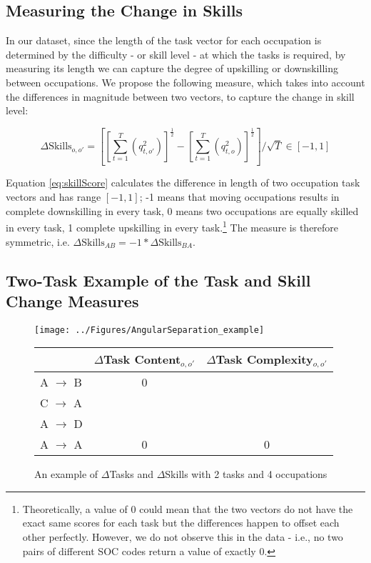 \documentclass[12pt,authoryear]{elsarticle}
\begin{document}
	
	
	
	\subsection{Measuring the Change in Skills}
	\label{sec:changeSkillLevel}
	In our dataset, since the length of the task vector for each occupation is determined by the difficulty - or skill level - at which the tasks is required, by measuring its length we can capture the degree of upskilling or downskilling between occupations. We propose the following measure, which takes into account the differences in magnitude between two vectors, to capture the change in skill level: 
	
	\begin{equation}
	\label{eq:skillScore}
	\Delta\text{Skills}_{o,o'} = \left[\left[\sum_{t=1}^{T}(q_{t,o'}^{2})\right]^{\frac{1}{2}} - \left[\sum_{t=1}^{T}(q_{t,o}^{2})\right]^{\frac{1}{2}} \right]/\sqrt{T} \in[-1,1]
	\end{equation}
	
	
	\noindent Equation \ref{eq:skillScore} calculates the difference in length of two occupation task vectors and has range $[-1,1]$; -1 means that moving occupations results in complete downskilling in every task, 0 means two occupations are equally skilled in every task, 1 complete upskilling in every task.\footnote{Theoretically, a value of 0 could mean that the two vectors do not have the exact same scores for each task but the differences happen to offset each other perfectly. However, we do not observe this in the data - i.e., no two pairs of different SOC codes return a value of exactly 0. } The measure is therefore symmetric, i.e. $\Delta\text{Skills}_{{A}{B}}  = -1* \Delta\text{Skills}_{{B}{A}}$.
	
	\subsection{Two-Task Example of the Task and Skill Change Measures}
	\label{sec:twoTaskEx}
	
	\begin{figure}[t]
		\centering
		\texttt{[image: ../Figures/AngularSeparation\_example]}
		\qquad
		\begin{tabular}{lcc}
			& $\Delta$Task Content$ _{o,o'}$& $\Delta$Task Complexity$_{o,o'}$\\
			\hline
			\hline
			A $\rightarrow$ B & 0 &   \\
			C $\rightarrow$ A &   &   \\
			A $\rightarrow$ D &   &   \\
			A $\rightarrow$ A & 0 & 0 \\
		\end{tabular}
		\caption{An example of $\Delta$Tasks and $\Delta$Skills with 2 tasks and 4 occupations}
		\label{fig:AngSep}
	\end{figure}
	
\end{document}
